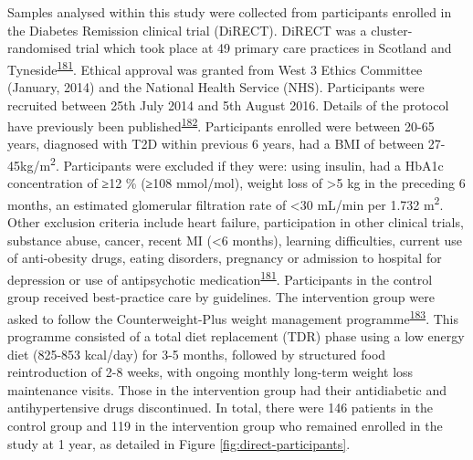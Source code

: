 \documentclass[11pt,twoside]{bristolthesis}
\begin{document}
Samples analysed within this study were collected from participants enrolled in the Diabetes Remission clinical trial (DiRECT). DiRECT was a cluster-randomised trial which took place at 49 primary care practices in Scotland and Tyneside\textsuperscript{\protect\hyperlink{ref-Lean2018}{181}}. Ethical approval was granted from West 3 Ethics Committee (January, 2014) and the National Health Service (NHS). Participants were recruited between 25th July 2014 and 5th August 2016. Details of the protocol have previously been published\textsuperscript{\protect\hyperlink{ref-Leslie2016}{182}}. Participants enrolled were between 20-65 years, diagnosed with T2D within previous 6 years, had a BMI of between 27-45kg/m\textsuperscript{2}. Participants were excluded if they were: using insulin, had a HbA1c concentration of ≥12 \% (≥108 mmol/mol), weight loss of \textgreater5 kg in the preceding 6 months, an estimated glomerular filtration rate of \textless30 mL/min per 1.732 m\textsuperscript{2}. Other exclusion criteria include heart failure, participation in other clinical trials, substance abuse, cancer, recent MI (\textless6 months), learning difficulties, current use of anti-obesity drugs, eating disorders, pregnancy or admission to hospital for depression or use of antipsychotic medication\textsuperscript{\protect\hyperlink{ref-Lean2018}{181}}. Participants in the control group received best-practice care by guidelines. The intervention group were asked to follow the Counterweight-Plus weight management programme\textsuperscript{\protect\hyperlink{ref-Lean2013}{183}}. This programme consisted of a total diet replacement (TDR) phase using a low energy diet (825-853 kcal/day) for 3-5 months, followed by structured food reintroduction of 2-8 weeks, with ongoing monthly long-term weight loss maintenance visits. Those in the intervention group had their antidiabetic and antihypertensive drugs discontinued. In total, there were 146 patients in the control group and 119 in the intervention group who remained enrolled in the study at 1 year, as detailed in Figure \ref{fig:direct-participants}.
\end{document}

